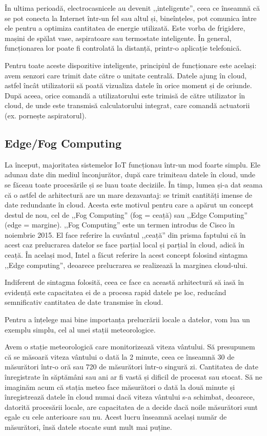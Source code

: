 În ultima perioadă, electrocasnicele au devenit ,,inteligente'', ceea ce înseamnă
că se pot conecta la Internet într-un fel sau altul și, bineînțeles, pot
comunica între ele pentru a optimiza cantitatea de energie utilizată. Este vorba
de frigidere, mașini de spălat vase, aspiratoare sau termostate
inteligente. În general, funcționarea lor poate fi controlată la distanță,
printr-o aplicație telefonică.

Pentru toate aceste dispozitive inteligente, principiul de funcționare este
același: avem senzori care trimit date către o unitate centrală. Datele ajung în
cloud, astfel încât utilizatorii să poată vizualiza datele în orice moment și de
oriunde. După aceea, orice comandă a utilizatorului este trimisă de către
utilizator în cloud, de unde este transmisă calculatorului integrat, care
comandă actuatorii (ex. pornește aspiratorul).

\subsection{Edge/Fog Computing}
\label{sec:embed-iot-edge}

La început, majoritatea sistemelor IoT funcționau într-un mod foarte simplu. Ele
adunau date din mediul înconjurător, după care trimiteau datele în cloud, unde
se făceau toate procesările și se luau toate deciziile. În timp, lumea și-a dat
seama că o astfel de arhitectură are un mare dezavantaj: se trimit cantități
imense de date redundante în cloud. Acesta este motivul pentru care a apărut un
concept destul de nou, cel de ,,Fog Computing'' (fog = ceață) sau ,,Edge Computing''
(edge = margine). ,,Fog Computing'' este un termen introdus de Cisco în noiembrie
2015. El face referire la cuvântul ,,ceață'' din prisma faptului că în acest caz
prelucrarea datelor se face parțial local și parțial în cloud,
adică în ceață. În același mod, Intel a făcut referire la acest concept folosind
sintagma ,,Edge computing'', deoarece prelucrarea se realizează la marginea
cloud-ului.

Indiferent de sintagma folosită, ceea ce face ca această arhitectură să iasă în
evidență este capacitatea ei de a procesa rapid datele pe loc, reducând
semnificativ cantitatea de date transmise în cloud.

Pentru a înțelege mai bine importanța prelucrării locale a datelor, vom lua un
exemplu simplu, cel al unei stații meteorologice.

Avem o stație meteorologică care monitorizează viteza vântului. Să presupunem că
se măsoară viteza vântului o dată la 2 minute, ceea ce înseamnă 30 de măsurători
într-o oră sau 720 de măsurători într-o singură zi. Cantitatea de date
înregistrate în săptămâni sau ani ar fi vastă și dificil de procesat sau stocat.
Să ne imaginăm acum că stația meteo face măsurători o dată la două minute și
înregistrează datele în cloud numai dacă viteza vântului s-a schimbat, deoarece,
datorită procesării locale, are capacitatea de a decide dacă noile măsurători
sunt egale cu cele anterioare sau nu. Acest lucru înseamnă același număr de
măsurători, însă datele stocate sunt mult mai puține.

